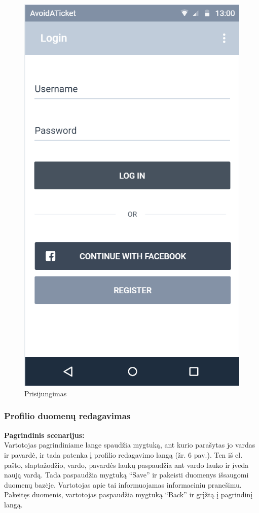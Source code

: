 \documentclass{VUMIFPSkursinis}
\begin{document}
	\begin{figure}[H]
				\centering
				\includegraphics[scale=0.3]{img/mockup_login}
				\caption{Prisijungimas}
				\label{img:prisijungimas}
			\end{figure}

\subsubsection{Profilio duomenų redagavimas}
	\textbf{Pagrindinis scenarijus:}\\
	Vartotojas pagrindiniame lange spaudžia mygtuką, ant kurio parašytas jo vardas ir pavardė, ir tada patenka į profilio 
	redagavimo langą (žr. 6 pav.). Ten iš el. pašto, slaptažodžio, vardo, pavardės laukų paspaudžia ant vardo lauko ir įveda naują vardą. 
	Tada paspaudžia mygtuką “Save” ir pakeisti duomenys išsaugomi duomenų bazėje. Vartotojas apie tai informuojamas informaciniu pranešimu. 
	Pakeitęs duomenis, vartotojas paspaudžia mygtuką “Back” ir grįžtą į pagrindinį langą.
\end{document}
